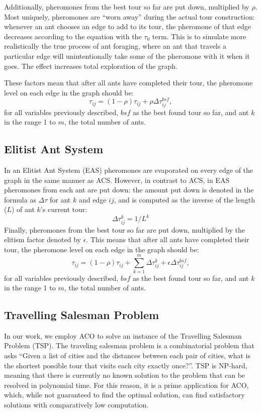 \documentclass[11pt,twocolumn]{article}
\begin{document}
Additionally, pheromones from the best tour so far are put down, multiplied by $\rho$. Most uniquely, pheromones are “worn away” during the actual tour construction: whenever an ant chooses an edge to add to its tour, the pheromone of that edge decreases according to the equation with the $\tau_0$ term. This is to simulate more realistically the true process of ant foraging, where an ant that travels a particular edge will unintentionally take some of the pheromone with it when it goes. The effect increases total exploration of the graph. 

These factors mean that after all ants have completed their tour, the pheromone level on each edge in the graph should be:
$$\tau_{ij} = (1 - \rho) \tau_{ij} + \rho \Delta \tau_{ij}^{bsf},$$
for all variables previously described, $bsf$ as the best found tour so far, and ant $k$ in the range 1 to $m$, the total number of ants.

\subsection{Elitist Ant System}
In an Elitist Ant System (EAS) pheromones are evaporated on every edge of the graph in the same manner as ACS. However, in contrast to ACS, in EAS pheromones from each ant are put down: the amount put down is denoted in the formula as $\Delta \tau$ for ant $k$ and edge $ij$, and is computed as the inverse of the length ($L$) of ant $k$'s current tour:
$$\Delta \tau_{ij}^k = 1/L^k $$ 
Finally, pheromones from the best tour so far are put down, multiplied by the elitism factor denoted by $\epsilon$. This means that after all ants have completed their tour, the pheromone level on each edge in the graph should be:
$$\tau_{ij} = (1 - \rho) \tau_{ij} + \sum _{k=1} ^{m} \Delta \tau_{ij} ^k + \epsilon \Delta \tau_{ij}^{bsf},$$
for all variables previously described, $bsf$ as the best found tour so far, and ant $k$ in the range 1 to $m$, the total number of ants.

\subsection{Travelling Salesman Problem}
In our work, we employ ACO to solve an instance of the Travelling Salesman Problem (TSP). The traveling salesman problem is a combinatorial problem that asks “Given a list of cities and the distances between each pair of cities, what is the shortest possible tour that visits each city exactly once?”. TSP is NP-hard, meaning that there is currently no known solution to the problem that can be resolved in polynomial time. For this reason, it is a prime application for ACO, which, while not guaranteed to find the optimal solution, can find satisfactory solutions with comparatively low computation. 
\end{document}
